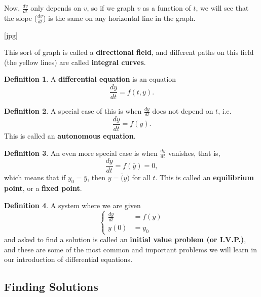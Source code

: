 \documentclass[a5paper]{article}
\theoremstyle{definition}%
\newtheorem*{definition*}{Definition}
\numberwithin{exercise}{section}
\theoremstyle{remark}%
\begin{document}
Now, $\frac{dv}{dt}$ only depends on $v$, so if we graph $v$ as a function of $t$, we will see that the slope ($\frac{dv}{dt}$) is the same on any horizontal line in the graph. 

[jpg]


This sort of graph is called a \textbf{directional field}, and different paths on this field (the yellow lines) are called \textbf{integral curves}. 

\pagebreak
\begin{highlight}
\begin{definition*}
A \textbf{differential equation} is an equation 
$$\frac{dy}{dt}=f(t,y).$$
\end{definition*}
\end{highlight}

\begin{highlight}
\begin{definition*}
A special case of this is when $\frac{dy}{dt}$ does not depend on $t$, i.e.
$$\frac{dy}{dt}=f(y).$$
This is called an \textbf{autonomous equation}. 
\end{definition*}
\end{highlight}

\begin{highlight}
\begin{definition*}
An even more special case is when $\frac{dy}{dt}$ vanishes, that is,
$$\frac{dy}{dt}=f(\bar{y})=0,$$
which means that if $y_0=\bar{y}$, then $y=\bar(y)$ for all $t$. This is called an \textbf{equilibrium point}, or a \textbf{fixed point}.
\end{definition*}
\end{highlight}

\begin{highlight}
\begin{definition*}
A system where we are given  
$$\begin{cases}
\frac{dy}{dt}&=f(y)\\
y(0)&=y_0
\end{cases}$$
and asked to find a solution is called an \textbf{initial value problem (or I.V.P.)}, and these are some of the most common and important problems we will learn in our introduction of differential equations. 
\end{definition*}
\end{highlight}

\subsection{Finding Solutions}
\end{document}
